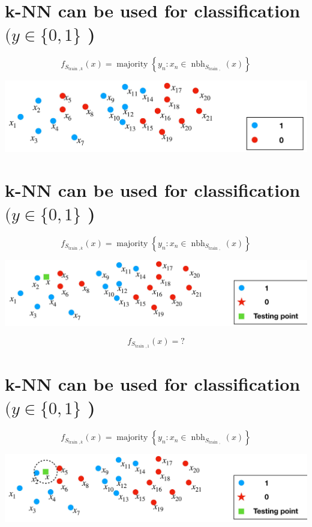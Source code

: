 \documentclass[10pt]{article}
\begin{document}
\section*{k-NN can be used for classification $(y \in\{0,1\}$ )}
$$
f_{S_{\text {train }, k}}(x)=\operatorname{majority}\left\{y_{n}: x_{n} \in \operatorname{nbh}_{S_{\text {train }, ~}}(x)\right\}
$$

\begin{center}
\includegraphics[max width=\textwidth]{2023_12_30_f937b0007b5d87b39f79g-14}
\end{center}

\section*{k-NN can be used for classification $(y \in\{0,1\}$ )}
$$
f_{S_{\text {train }, k}}(x)=\operatorname{majority}\left\{y_{n}: x_{n} \in \operatorname{nbh}_{S_{\text {train }, ~}}(x)\right\}
$$

\begin{center}
\includegraphics[max width=\textwidth]{2023_12_30_f937b0007b5d87b39f79g-15}
\end{center}

$$
f_{S_{\text {train }, 1}}(x)=?
$$

\section*{k-NN can be used for classification $(y \in\{0,1\}$ )}
$$
f_{S_{\text {train }, k}}(x)=\operatorname{majority}\left\{y_{n}: x_{n} \in \operatorname{nbh}_{S_{\text {train }, ~}}(x)\right\}
$$

\begin{center}
\includegraphics[max width=\textwidth]{2023_12_30_f937b0007b5d87b39f79g-16}
\end{center}
\end{document}
